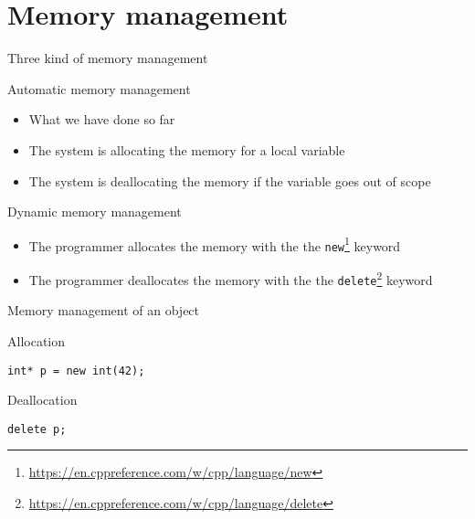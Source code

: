 \documentclass[12pt,t]{beamer}
\begin{document}
\section{Memory management}


\begin{frame}{Three kind of memory management}

\begin{block}{Automatic memory management}
\begin{itemize}
\item What we have done so far
\item The system is allocating the memory for a local variable
\item The system is deallocating the memory if the variable goes out of scope
\end{itemize}
\end{block}

\begin{block}{Dynamic memory management}
\begin{itemize}
\item The programmer allocates the memory with the the \lstinline|new|\footnote{\tiny\url{https://en.cppreference.com/w/cpp/language/new}} keyword
\item The programmer deallocates the memory with the the \lstinline|delete|\footnote{\tiny\url{https://en.cppreference.com/w/cpp/language/delete}} keyword
\end{itemize}
\end{block}

\end{frame}

\begin{frame}[fragile]{Memory management of an object}

\begin{block}{Allocation}
\begin{lstlisting}
int* p = new int(42);
\end{lstlisting}
\end{block}

\begin{block}{Deallocation}
\begin{lstlisting}
delete p;
\end{lstlisting}
\end{block}


\end{frame}
\end{document}
